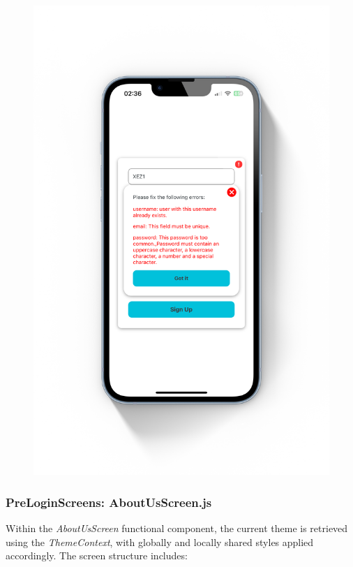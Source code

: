 \begin{figure}[!ht]
\begin{minipage}{0.5\textwidth}
        \includegraphics[scale=0.08]{LATEX/Appendices/Images/Software/Frontend/sign_up_screen_2.png}
        \label{fig:sign up screen 2}
        \end{minipage}
\end{figure}

\subsubsection{PreLoginScreens: AboutUsScreen.js}

Within the \textit{AboutUsScreen} functional component, the current theme is retrieved using the \textit{ThemeContext}, with globally and locally shared styles applied accordingly. The screen structure includes:

